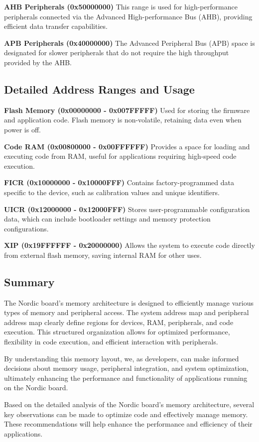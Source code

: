 \documentclass{Configuration_Files/PoliMi3i_thesis}
\begin{document}
\textbf{AHB Peripherals (0x50000000)}
This range is used for high-performance peripherals connected via the Advanced High-performance Bus (AHB), providing efficient data transfer capabilities.

\textbf{APB Peripherals (0x40000000)}
The Advanced Peripheral Bus (APB) space is designated for slower peripherals that do not require the high throughput provided by the AHB.

\subsection{Detailed Address Ranges and Usage}

\textbf{Flash Memory (0x00000000 - 0x007FFFFF)}
Used for storing the firmware and application code. Flash memory is non-volatile, retaining data even when power is off.

\textbf{Code RAM (0x00800000 - 0x00FFFFFF)}
Provides a space for loading and executing code from RAM, useful for applications requiring high-speed code execution.

\textbf{FICR (0x10000000 - 0x10000FFF)}
Contains factory-programmed data specific to the device, such as calibration values and unique identifiers.

\textbf{UICR (0x12000000 - 0x12000FFF)}
Stores user-programmable configuration data, which can include bootloader settings and memory protection configurations.

\textbf{XIP (0x19FFFFFF - 0x20000000)}
Allows the system to execute code directly from external flash memory, saving internal RAM for other uses.

\subsection{Summary}
The Nordic board's memory architecture is designed to efficiently manage various types of memory and peripheral access. The system address map and peripheral address map clearly define regions for devices, RAM, peripherals, and code execution. This structured organization allows for optimized performance, flexibility in code execution, and efficient interaction with peripherals.

By understanding this memory layout, we, as developers, can make informed decisions about memory usage, peripheral integration, and system optimization, ultimately enhancing the performance and functionality of applications running on the Nordic board.

Based on the detailed analysis of the Nordic board's memory architecture, several key observations can be made to optimize code and effectively manage memory. These recommendations will help enhance the performance and efficiency of their applications.
\end{document}
